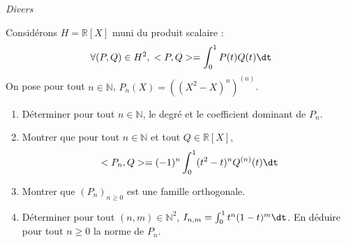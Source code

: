\documentclass[a4paper,10pt]{report}
\begin{document}
\medskip

\begin{center}
\textit{{ {\large Divers}}}
\end{center}

\medskip


\begin{Exa} Considérons $H= \mathbb{R}[X]$ muni du produit scalaire :
$$ \forall (P,Q) \in H^2, \; <P,Q> = \int_{0}^1 P(t) Q(t) \dt $$
On pose pour tout $n \in \mathbb{N}$, $P_n(X)= ((X^2-X)^n)^{(n)}$.

\begin{enumerate}
\item Déterminer pour tout $n \in \mathbb{N}$, le degré et le coefficient dominant de $P_n$.
\item Montrer que pour tout $n \in \mathbb{N}$ et tout $Q \in \mathbb{R}[X]$,
$$ <P_n,Q> = (-1)^n \int_{0}^1 (t^2-t)^n Q^{(n)}(t) \dt $$
\item Montrer que $(P_n)_{n \geq 0}$ est une famille orthogonale.
\item Déterminer pour tout $(n,m) \in \mathbb{N}^2$, $I_{n,m} = \int_{0}^1 t^n(1-t)^m \dt$. En déduire pour tout $n \geq 0$ la norme de $P_n$.
\end{enumerate}
\end{Exa}

\corr 
\end{document}
